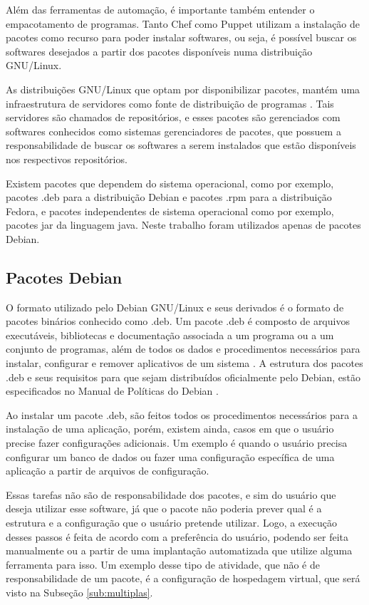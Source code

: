 Além das ferramentas de automação, é importante também entender o empacotamento de
programas. Tanto Chef como Puppet utilizam a instalação de pacotes como recurso para
poder instalar softwares, ou seja, é possível buscar os softwares desejados a partir
dos pacotes disponíveis numa distribuição GNU/Linux. 

As distribuições GNU/Linux que
optam por disponibilizar pacotes, mantém uma infraestrutura de servidores como fonte
de distribuição de programas \cite{araujo2011apprecommender}. Tais servidores são
chamados de repositórios, e esses pacotes são gerenciados com softwares conhecidos
como sistemas gerenciadores de pacotes, que possuem a responsabilidade de buscar
os softwares a serem instalados que estão disponíveis nos respectivos repositórios.

Existem pacotes que dependem do sistema operacional, como por exemplo, pacotes .deb
para a distribuição Debian e pacotes .rpm para a distribuição Fedora, e
pacotes independentes de sistema operacional como por exemplo, pacotes jar da
linguagem java. Neste trabalho foram utilizados apenas de pacotes Debian.


\subsection{Pacotes Debian}

O formato utilizado pelo Debian GNU/Linux e seus derivados é o formato de pacotes
binários conhecido como .deb. Um pacote .deb é composto de arquivos executáveis,
bibliotecas e documentação associada a um programa ou a um conjunto de programas,
além de todos os dados e procedimentos necessários para instalar, configurar e remover
aplicativos de um sistema \cite{araujo2011apprecommender}. A estrutura dos pacotes 
.deb e seus requisitos para que sejam distribuídos oficialmente pelo Debian,
estão especificados no Manual de Políticas do Debian \cite{debian}.

Ao instalar um pacote .deb, são feitos todos os procedimentos necessários para a instalação
de uma aplicação, porém, existem ainda, casos em que o usuário precise fazer
configurações adicionais. Um exemplo é quando o usuário precisa configurar um banco de dados
ou fazer uma configuração específica de uma aplicação a partir de arquivos de configuração.

Essas tarefas não são de responsabilidade dos pacotes, e sim do usuário que deseja utilizar esse
software, já que o pacote não poderia prever qual é a estrutura e a configuração
que o usuário pretende utilizar. Logo, a execução desses passos é feita de
acordo com a preferência do usuário, podendo ser feita manualmente ou a partir
de uma implantação automatizada que utilize alguma ferramenta para isso. Um exemplo
desse tipo de atividade, que não é de responsabilidade de um pacote, é a configuração
de hospedagem virtual, que será visto na Subseção \ref{sub:multiplas}.

